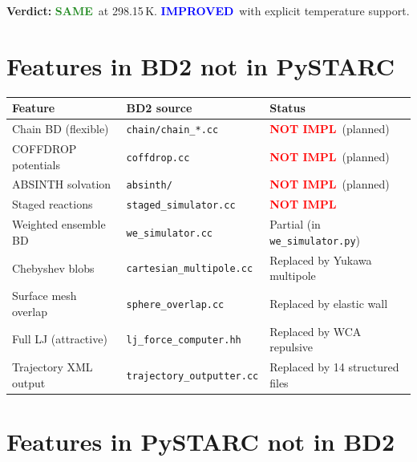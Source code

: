 \documentclass[11pt]{article}
\newcommand{\same}{\textcolor{ForestGreen}{\textbf{SAME}}}
\newcommand{\improved}{\textcolor{Blue}{\textbf{IMPROVED}}}
\newcommand{\notimpl}{\textcolor{Red}{\textbf{NOT IMPL}}}
\begin{document}
\textbf{Verdict:} \same\ at 298.15\,K. \improved\ with explicit temperature support.


\section{Features in BD2 not in PySTARC}

\begin{longtable}{lll}
\toprule
Feature & BD2 source & Status \\
\midrule
Chain BD (flexible) & \texttt{chain/chain\_*.cc} & \notimpl\ (planned) \\
COFFDROP potentials & \texttt{coffdrop.cc} & \notimpl\ (planned) \\
ABSINTH solvation & \texttt{absinth/} & \notimpl\ (planned) \\
Staged reactions & \texttt{staged\_simulator.cc} & \notimpl \\
Weighted ensemble BD & \texttt{we\_simulator.cc} & Partial (in \texttt{we\_simulator.py}) \\
Chebyshev blobs & \texttt{cartesian\_multipole.cc} & Replaced by Yukawa multipole \\
Surface mesh overlap & \texttt{sphere\_overlap.cc} & Replaced by elastic wall \\
Full LJ (attractive) & \texttt{lj\_force\_computer.hh} & Replaced by WCA repulsive \\
Trajectory XML output & \texttt{trajectory\_outputter.cc} & Replaced by 14 structured files \\
\bottomrule
\end{longtable}


\section{Features in PySTARC not in BD2}
\end{document}
